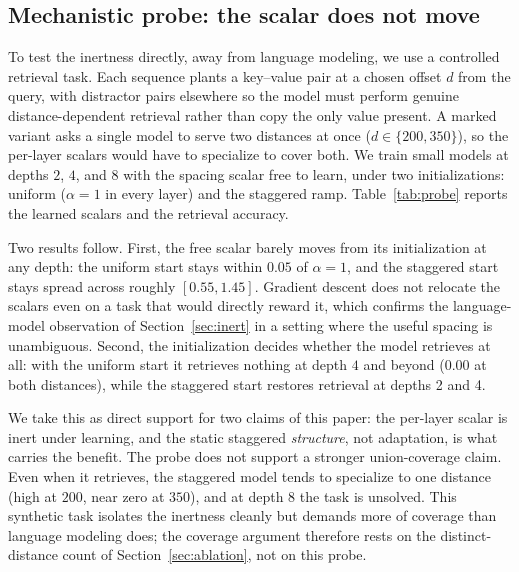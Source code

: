 \documentclass[11pt]{article}
\begin{document}
\subsection{Mechanistic probe: the scalar does not move}
\label{sec:probe}

To test the inertness directly, away from language modeling, we use a controlled
retrieval task. Each sequence plants a key--value pair at a chosen offset $d$ from
the query, with distractor pairs elsewhere so the model must perform genuine
distance-dependent retrieval rather than copy the only value present. A marked
variant asks a single model to serve two distances at once ($d\in\{200,350\}$), so
the per-layer scalars would have to specialize to cover both. We train small models
at depths $2$, $4$, and $8$ with the spacing scalar free to learn, under two
initializations: uniform ($\alpha=1$ in every layer) and the staggered ramp.
Table~\ref{tab:probe} reports the learned scalars and the retrieval accuracy.

Two results follow. First, the free scalar barely moves from its initialization at
any depth: the uniform start stays within $0.05$ of $\alpha=1$, and the staggered
start stays spread across roughly $[0.55,1.45]$. Gradient descent does not
relocate the scalars even on a task that would directly reward it, which confirms
the language-model observation of Section~\ref{sec:inert} in a setting where the
useful spacing is unambiguous. Second, the initialization decides whether the
model retrieves at all: with the uniform start it retrieves nothing at depth $4$
and beyond ($0.00$ at both distances), while the staggered start restores retrieval
at depths 2 and 4.

We take this as direct support for two claims of this paper: the per-layer scalar
is inert under learning, and the static staggered \emph{structure}, not adaptation,
is what carries the benefit. The probe does not support a stronger union-coverage
claim. Even when it retrieves, the staggered model tends to specialize to one
distance (high at $200$, near zero at $350$), and at depth $8$ the task is
unsolved. This synthetic task isolates the inertness cleanly but demands more of
coverage than language modeling does; the coverage argument therefore rests on the
distinct-distance count of Section~\ref{sec:ablation}, not on this probe.
\end{document}
